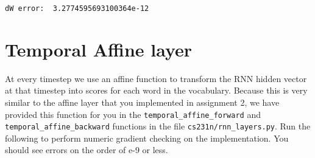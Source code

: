 \documentclass[11pt]{article}
\begin{document}
    \begin{Verbatim}[commandchars=\\\{\}]
dW error:  3.2774595693100364e-12

    \end{Verbatim}

    \hypertarget{temporal-affine-layer}{%
\section{Temporal Affine layer}\label{temporal-affine-layer}}

At every timestep we use an affine function to transform the RNN hidden
vector at that timestep into scores for each word in the vocabulary.
Because this is very similar to the affine layer that you implemented in
assignment 2, we have provided this function for you in the
\texttt{temporal\_affine\_forward} and
\texttt{temporal\_affine\_backward} functions in the file
\texttt{cs231n/rnn\_layers.py}. Run the following to perform numeric
gradient checking on the implementation. You should see errors on the
order of e-9 or less.
\end{document}
